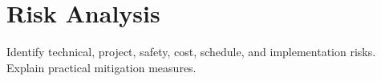 \section{Risk Analysis}
Identify technical, project, safety, cost, schedule, 
and implementation risks. Explain practical mitigation measures.